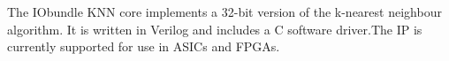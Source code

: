 The IObundle KNN core implements a 32-bit version of the k-nearest neighbour algorithm. It is written in Verilog and includes a C software driver.The IP is currently
supported for use in ASICs and FPGAs.
